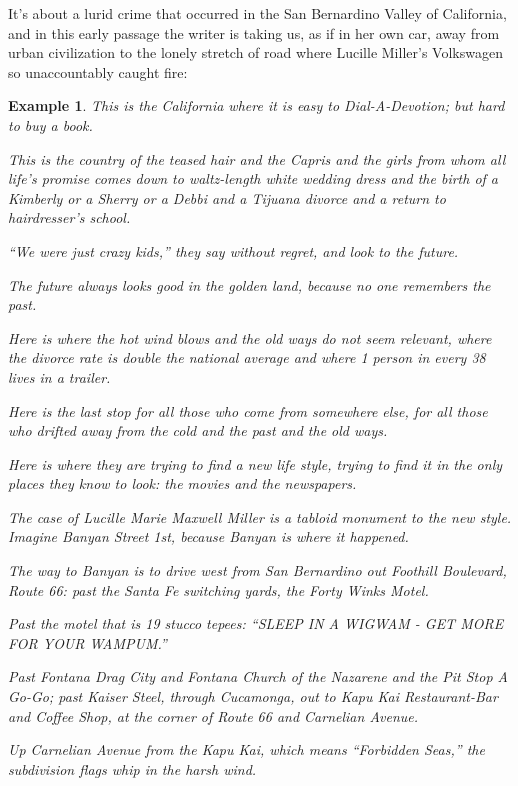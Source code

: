\documentclass{book}
\numberwithin{equation}{section}
\newtheorem{example}{Example}[chapter]
\begin{document}
It's about a lurid crime that occurred in the San Bernardino Valley of California, and in this early passage the writer is taking us, as if in her own car, away from urban civilization to the lonely stretch of road where Lucille Miller's Volkswagen so unaccountably caught fire:
\begin{example}
    This is the California where it is easy to Dial-A-Devotion; but hard to buy a book.
    
    This is the country of the teased hair and the Capris and the girls from whom all life's promise comes down to waltz-length white wedding dress and the birth of a Kimberly or a Sherry or a Debbi and a Tijuana divorce and a return to hairdresser's school.
    
    ``We were just crazy kids,'' they say without regret, and look to the future.
    
    The future always looks good in the golden land, because no one remembers the past.
    
    Here is where the hot wind blows and the old ways do not seem relevant, where the divorce rate is double the national average and where 1 person in every 38 lives in a trailer.
    
    Here is the last stop for all those who come from somewhere else, for all those who drifted away from the cold and the past and the old ways.
    
    Here is where they are trying to find a new life style, trying to find it in the only places they know to look: the movies and the newspapers.
    
    The case of Lucille Marie Maxwell Miller is a tabloid monument to the new style.
    \\
    
    Imagine Banyan Street 1st, because Banyan is where it happened.
    
    The way to Banyan is to drive west from San Bernardino out Foothill Boulevard, Route 66: past the Santa Fe switching yards, the Forty Winks Motel.
    
    Past the motel that is 19 stucco tepees: ``SLEEP IN A WIGWAM - GET MORE FOR YOUR WAMPUM.''
    
    Past Fontana Drag City and Fontana Church of the Nazarene and the Pit Stop A Go-Go; past Kaiser Steel, through Cucamonga, out to Kapu Kai Restaurant-Bar and Coffee Shop, at the corner of Route 66 and Carnelian Avenue.
    
    Up Carnelian Avenue from the Kapu Kai, which means ``Forbidden Seas,'' the subdivision flags whip in the harsh wind.
    

\end{example}
\end{document}

